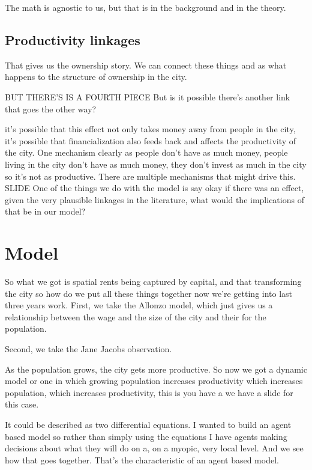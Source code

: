 The math is agnostic to us, but that is in the background and in the theory. 


\subsection{Productivity linkages}

That gives us the ownership story. We can connect these things and as what happens to the structure of ownership in the city. 

BUT THERE'S IS A FOURTH PIECE
But is it possible there's another link that goes the other way?

it's  possible that this effect not only takes money away from people in the city, it's possible that financialization also feeds back and  affects the productivity of the city. One mechanism clearly as people don't have as much money, people living in the city don't have as much money, they don't invest as much in the city so it's not as productive. 
There are multiple mechanisms that might drive this. SLIDE
One of the things we do with the model is say okay if there was an effect, given the very plausible linkages in the literature, what would the implications of that be in our model?

\section{Model}

So what we got is spatial rents being captured by capital, and that transforming the city so how do we put all these things together now we're getting into last three years work.
First, we take the Allonzo model, which just gives us a relationship between the wage and the size of the city and their for the population.

Second, we take the Jane Jacobs observation.

As the population grows, the city gets more productive. So now we got a dynamic model or one in which growing population increases productivity which increases population, which increases productivity, this is you have a we have a slide for this case.

It could be described as two differential equations. I wanted to build an agent based model so rather than simply using the equations I have agents making decisions about what they will do on a, on a myopic, very local level. And we see how that goes together. That's the characteristic of an agent based model.


